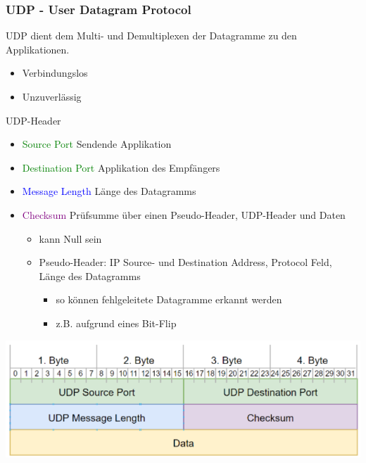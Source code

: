 \subsubsection{UDP - User Datagram Protocol}

\begin{definition}{UDP}
    dient dem Multi- und Demultiplexen der Datagramme zu den Applikationen.
    \begin{itemize}
        \item Verbindungslos
        \item Unzuverlässig
    \end{itemize}
\end{definition}

\begin{concept}{UDP-Header}
    \begin{itemize}
        \item \textcolor{green}{Source Port} Sendende Applikation
        \item \textcolor{green}{Destination Port} Applikation des Empfängers
        \item \textcolor{blue}{Message Length} Länge des Datagramms
        \item \textcolor{purple}{Checksum} Prüfsumme über einen Pseudo-Header, UDP-Header und Daten
        \begin{itemize}
            \item kann Null sein
            \item Pseudo-Header: IP Source- und Destination Address, Protocol Feld, Länge des Datagramms
            \begin{itemize}
                \item so können fehlgeleitete Datagramme erkannt werden
                \item z.B. aufgrund eines Bit-Flip
            \end{itemize}
        \end{itemize}
    \end{itemize}
        \includegraphics[width=1\linewidth]{images/udp.png}
\end{concept}

